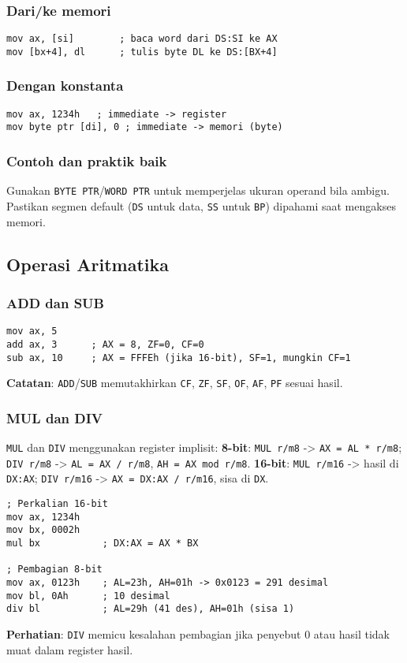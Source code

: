 \subsubsection{Dari/ke memori}
\begin{verbatim}
mov ax, [si]        ; baca word dari DS:SI ke AX
mov [bx+4], dl      ; tulis byte DL ke DS:[BX+4]
\end{verbatim}

\subsubsection{Dengan konstanta}
\begin{verbatim}
mov ax, 1234h   ; immediate -> register
mov byte ptr [di], 0 ; immediate -> memori (byte)
\end{verbatim}

\subsubsection{Contoh dan praktik baik}
Gunakan \texttt{BYTE PTR}/\texttt{WORD PTR} untuk memperjelas ukuran operand bila ambigu. Pastikan segmen default (\texttt{DS} untuk data, \texttt{SS} untuk \texttt{BP}) dipahami saat mengakses memori.

\subsection{Operasi Aritmatika}
\subsubsection{ADD dan SUB}
\begin{verbatim}
mov ax, 5
add ax, 3      ; AX = 8, ZF=0, CF=0
sub ax, 10     ; AX = FFFEh (jika 16-bit), SF=1, mungkin CF=1
\end{verbatim}
\textbf{Catatan}: \texttt{ADD}/\texttt{SUB} memutakhirkan \texttt{CF}, \texttt{ZF}, \texttt{SF}, \texttt{OF}, \texttt{AF}, \texttt{PF} sesuai hasil.

\subsubsection{MUL dan DIV}
\texttt{MUL} dan \texttt{DIV} menggunakan register implisit:\newline
\textbf{8-bit}: \texttt{MUL r/m8} -> \texttt{AX = AL * r/m8}; \texttt{DIV r/m8} -> \texttt{AL = AX / r/m8}, \texttt{AH = AX mod r/m8}.\newline
\textbf{16-bit}: \texttt{MUL r/m16} -> hasil di \texttt{DX:AX}; \texttt{DIV r/m16} -> \texttt{AX = DX:AX / r/m16}, sisa di \texttt{DX}.
\begin{verbatim}
; Perkalian 16-bit
mov ax, 1234h
mov bx, 0002h
mul bx           ; DX:AX = AX * BX

; Pembagian 8-bit
mov ax, 0123h    ; AL=23h, AH=01h -> 0x0123 = 291 desimal
mov bl, 0Ah      ; 10 desimal
div bl           ; AL=29h (41 des), AH=01h (sisa 1)
\end{verbatim}
\textbf{Perhatian}: \texttt{DIV} memicu kesalahan pembagian jika penyebut 0 atau hasil tidak muat dalam register hasil.

